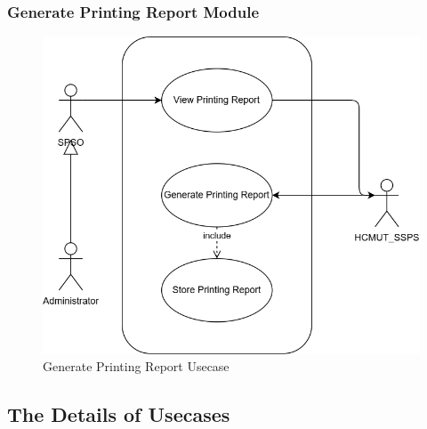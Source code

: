 \subsubsection{Generate Printing Report Module}
\begin{figure}[htbp]
	\centering
	\includegraphics[width=1.0\textwidth]{Images/Usecases/View_Printing_Report_usecase.png}
	\vspace{15pt}
	\caption{\fontsize{12pt}{0pt}\selectfont Generate Printing Report Usecase}
\end{figure}
\newpage

\subsection{The Details of Usecases}
